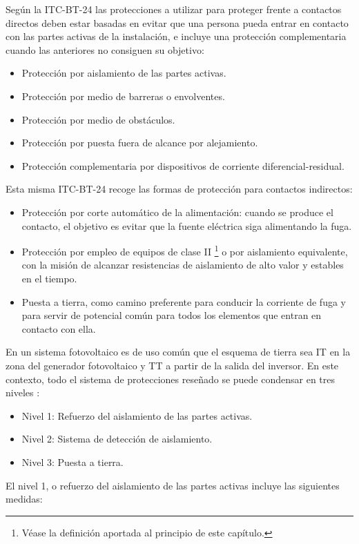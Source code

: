 Según la ITC-BT-24 las protecciones a utilizar para proteger frente
a contactos directos deben estar basadas en evitar que una persona
pueda entrar en contacto con las partes activas de la instalación,
e incluye una protección complementaria cuando las anteriores no consiguen
su objetivo:
\begin{itemize}
\item Protección por aislamiento de las partes activas.
\item Protección por medio de barreras o envolventes.
\item Protección por medio de obstáculos.
\item Protección por puesta fuera de alcance por alejamiento.
\item Protección complementaria por dispositivos de corriente diferencial-residual.
\end{itemize}
Esta misma ITC-BT-24 recoge las formas de protección para contactos
indirectos:
\begin{itemize}
\item Protección por corte automático de la alimentación: cuando se produce
el contacto, el objetivo es evitar que la fuente eléctrica siga alimentando
la fuga.
\item Protección por empleo de equipos de clase II%
\footnote{Véase la definición aportada al principio de este capítulo.%
} o por aislamiento equivalente, con la misión de alcanzar resistencias
de aislamiento de alto valor y estables en el tiempo.
\item Puesta a tierra, como camino preferente para conducir la corriente
de fuga y para servir de potencial común para todos los elementos
que entran en contacto con ella.
\end{itemize}
En un sistema fotovoltaico es de uso común que el esquema de tierra
sea IT en la zona del generador fotovoltaico y TT a partir de la salida
del inversor. En este contexto, todo el sistema de protecciones reseñado
se puede condensar en tres niveles \cite{Gomez-Vidal2000}:
\begin{itemize}
\item Nivel 1: Refuerzo del aislamiento de las partes activas. 
\item Nivel 2: Sistema de detección de aislamiento.
\item Nivel 3: Puesta a tierra.
\end{itemize}
El nivel 1, o refuerzo del aislamiento de las partes activas incluye
las siguientes medidas:
